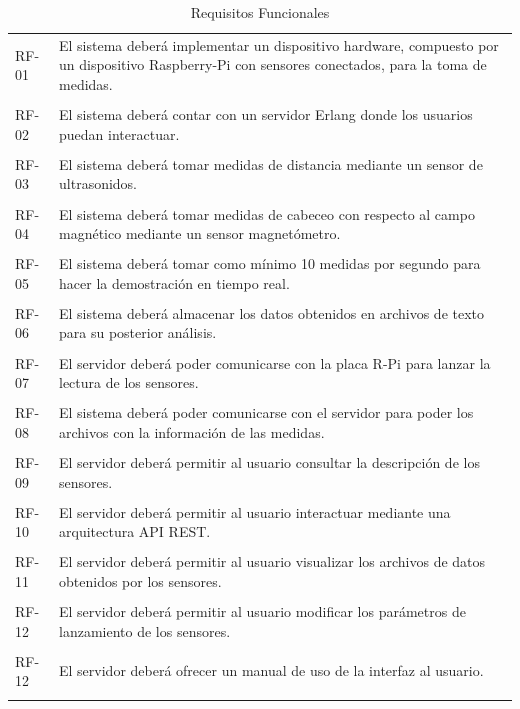 \begin{table}[htbp]
\begin{tabular}{p{2cm} p{12cm}}
RF-01 & El sistema deberá implementar un dispositivo hardware, compuesto por un dispositivo Raspberry-Pi con sensores conectados, para la toma de medidas. \\ \\
RF-02 & El sistema deberá contar con un servidor Erlang donde los usuarios puedan interactuar.\\ \\
RF-03 &  El sistema deberá tomar medidas de distancia mediante un sensor de ultrasonidos.\\ \\
RF-04 &  El sistema deberá tomar medidas de cabeceo con respecto al campo magnético mediante un sensor magnetómetro.\\ \\
RF-05 &  El sistema deberá tomar como mínimo 10 medidas por segundo para hacer la demostración en tiempo real.\\ \\
RF-06 &  El sistema deberá almacenar los datos obtenidos en archivos de texto para su posterior análisis.\\ \\
RF-07 &  El servidor deberá poder comunicarse con la placa R-Pi para lanzar la lectura de los sensores.\\ \\
RF-08 & El sistema deberá poder comunicarse con el servidor para poder los archivos con la información de las medidas.\\ \\
RF-09 & El servidor deberá permitir al usuario consultar la descripción de los sensores. \\ \\
RF-10 & El servidor deberá permitir al usuario interactuar mediante una arquitectura API REST. \\ \\
RF-11 & El servidor deberá permitir al usuario visualizar los archivos de datos obtenidos por los sensores. \\ \\
RF-12 & El servidor deberá permitir al usuario modificar los parámetros de lanzamiento de los sensores. \\ \\
RF-12 & El servidor deberá ofrecer un manual de uso de la interfaz al usuario. \\ \\



\end{tabular}
\label{tab:requisitosfunionales}
\caption{Requisitos Funcionales}
\end{table}

